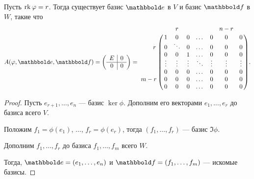\documentclass[a4paper]{article}
\begin{document}
\begin{colloq}
            \begin{proposal}
                Пусть $\operatorname{\mathop{\mathrm{rk}}} \varphi = r$. Тогда существует базис $\E$ в $V$ и базис $\F$ в $W$, такие что
                \begin{equation*}
                    A(\phi, \E, \F) = \left(
                        \begin{array}{c|c}
                            E & 0 \\
                            \hline
                            0 & 0
                        \end{array}
                    \right) = \bordermatrix{    
                        &   & r &   &   &   & n - r &   \cr
                        & 1 & 0 & 0 & \dots & 0 & 0 & 0 \cr
                      \hspace{0.7cm} r & 0 & \ddots & 0 & \dots & 0 & 0 & 0 \cr
                        & 0 & 0 & 1 & \dots & 0 & 0 & 0 \cr
                        & \vdots & \vdots & \vdots & \ddots & \vdots & \vdots & \vdots \cr
                        & 0 & 0 & 0 & \dots & 0 & 0 & 0 \cr
                  m - r & 0 & 0 & 0 & \dots & 0 & 0 & 0 \cr
                        & 0 & 0 & 0 & \dots & 0 & 0 & 0
                    }
                .\end{equation*}
            \end{proposal}

            \begin{proof}
                Пусть $e_{r + 1}, \dots, e_n$ --- базис $\ker \phi$. Дополним его векторами $e_1, \dots, e_r$ до базиса всего $V$.

                Положим $f_1 = \phi(e_1)$, $\dots$, $f_r = \phi(e_r)$, тогда $(f_1, \dots, f_r)$ --- базис $\Im \phi$.

                Дополним $f_1, \dots, f_r$ до базиса $f_1, \dots, f_m$ всего $W$.

                Тогда, $\E = (e_1, \dots, e_n)$ и $\F = (f_1, \dots, f_m)$ --- искомые базисы.
            \end{proof}

    \end{colloq}
\end{document}
